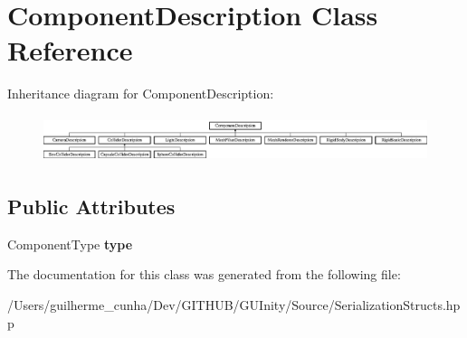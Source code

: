 \hypertarget{class_component_description}{}\section{Component\+Description Class Reference}
\label{class_component_description}
Inheritance diagram for Component\+Description\+:\begin{figure}[H]
\begin{center}
\leavevmode
\includegraphics[height=1.379310cm]{class_component_description}
\end{center}
\end{figure}
\subsection*{Public Attributes}
\begin{DoxyCompactItemize}
\item 
\hypertarget{class_component_description_a44f422a98827af2805af6f58124aa23f}{}Component\+Type {\bfseries type}\label{class_component_description_a44f422a98827af2805af6f58124aa23f}

\end{DoxyCompactItemize}


The documentation for this class was generated from the following file\+:\begin{DoxyCompactItemize}
\item 
/\+Users/guilherme\+\_\+cunha/\+Dev/\+G\+I\+T\+H\+U\+B/\+G\+U\+Inity/\+Source/Serialization\+Structs.\+hpp\end{DoxyCompactItemize}
